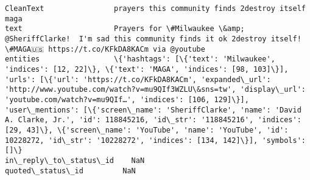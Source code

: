 \documentclass[11pt]{article}
\begin{document}
\begin{Verbatim}[commandchars=\\\{\}]
CleanText                prayers this community finds 2destroy itself maga                                                                                                                                                                                                                                                                                                                                                                                                                                                                                                                      
text                     Prayers for \#Milwaukee \&amp; @SheriffClarke!  I'm sad this community finds it ok 2destroy itself! \#MAGA🇺🇸 https://t.co/KFkDA8KACm via @youtube                                                                                                                                                                                                                                                                                                                                                                                                                         
entities                 \{'hashtags': [\{'text': 'Milwaukee', 'indices': [12, 22]\}, \{'text': 'MAGA', 'indices': [98, 103]\}], 'urls': [\{'url': 'https://t.co/KFkDA8KACm', 'expanded\_url': 'http://www.youtube.com/watch?v=mu9QIf3WZLU\&sns=tw', 'display\_url': 'youtube.com/watch?v=mu9QIf…', 'indices': [106, 129]\}], 'user\_mentions': [\{'screen\_name': 'SheriffClarke', 'name': 'David A. Clarke, Jr.', 'id': 118845216, 'id\_str': '118845216', 'indices': [29, 43]\}, \{'screen\_name': 'YouTube', 'name': 'YouTube', 'id': 10228272, 'id\_str': '10228272', 'indices': [134, 142]\}], 'symbols': []\}
in\_reply\_to\_status\_id    NaN                                                                                                                                                                                                                                                                                                                                                                                                                                                                                                                                                                    
quoted\_status\_id         NaN                                                                                                                                                                                                                                                                                                                                                                                                                                                                                                                                                                    

\end{Verbatim}
\end{document}
